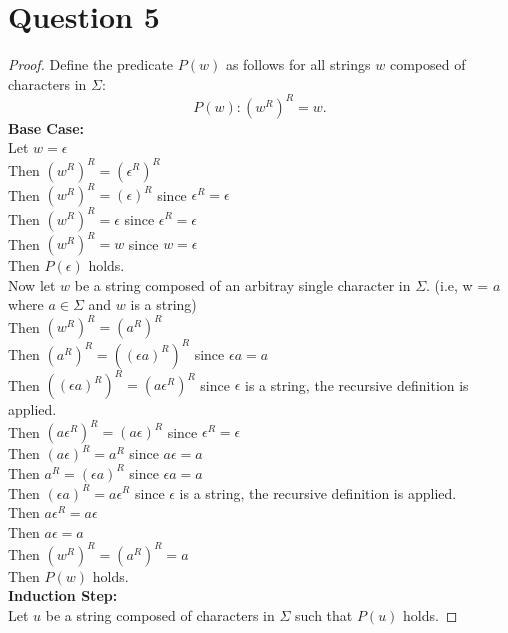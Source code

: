 \documentclass[12pt]{article}
\begin{document}
\section*{Question 5}

\begin{proof}
Define the predicate $P(w)$ as follows for all strings $w$ composed of characters in $\Sigma$: \\
$$P(w):{({w}^{R})}^{R} = w.$$
\textbf{Base Case:}
\\Let $w = \epsilon$
\\\indent Then ${({w}^{R})}^{R} = {({\epsilon}^{R})}^{R} $
\\\indent Then ${({w}^{R})}^{R} = {(\epsilon)}^{R} $ since ${\epsilon}^{R} = \epsilon$
\\\indent Then ${({w}^{R})}^{R} = \epsilon $ since ${\epsilon}^{R} = \epsilon$
\\\indent Then ${({w}^{R})}^{R} = w $ since $w = \epsilon$
\\Then $P(\epsilon)$ holds.
\\Now let $w$ be a string composed of an arbitray single character in $\Sigma$. (i.e, w = $a$ where
$a \in \Sigma$ and $w$ is a string)
\\\indent Then ${({w}^{R})}^{R} = {({a}^{R})}^{R} $
\\\indent Then ${({a}^{R})}^{R}  = {({(\epsilon a)}^{R})}^{R} $ since $\epsilon a = a$
\\\indent Then ${({(\epsilon a)}^{R})}^{R} = {(a{\epsilon}^{R})}^{R} $ since $\epsilon$ is a string, the recursive definition is applied.
\\\indent Then ${(a{\epsilon}^{R})}^{R} = {(a\epsilon)}^{R}$ since ${\epsilon}^{R} = \epsilon$
\\\indent Then ${(a\epsilon)}^{R} = {a}^{R}$ since $a\epsilon  = a$
\\\indent Then ${a}^{R}= {(\epsilon a)}^{R}$ since $\epsilon a = a$
\\\indent Then  ${(\epsilon a)}^{R} = a {\epsilon}^{R}$ since $\epsilon$ is a string, the recursive definition is applied.
\\\indent Then $a {\epsilon}^{R} = a \epsilon$
\\\indent Then $a \epsilon = a$
\\\indent Then ${({w}^{R})}^{R} = {({a}^{R})}^{R} = a $
\\ Then $P(w)$ holds.
\\\textbf{Induction Step:}
\\Let $u$ be a string composed of characters in $\Sigma$ such that $P(u)$ holds.

\end{proof}
\end{document}
